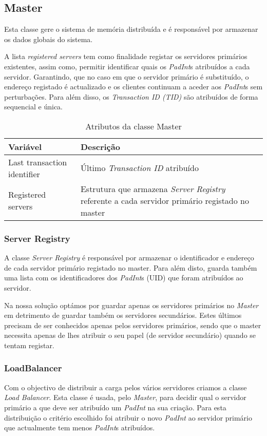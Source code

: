 \subsection{Master}

Esta classe gere o sistema de memória distribuída e é responsável por armazenar os dados globais do sistema.

A lista \textit{registered servers} tem como finalidade registar os servidores primários existentes, assim como, permitir identificar quais os \textit{PadInt}s atribuídos a cada servidor. Garantindo, que no caso em que o servidor primário é substituído, o endereço registado é actualizado e os clientes continuam a aceder aos \textit{PadInt}s sem perturbações. Para além disso, os \textit{Transaction ID (TID)} são atribuídos de forma sequencial e única.
\begin{table}[H]
\centering
\begin{tabular}{| p{2cm} | p{5cm} |}
\hline
\textbf{Variável} & \textbf{Descrição} \\
\hline
Last transaction
identifier & Último \textit{Transaction ID} atribuído \\
\hline
Registered
servers & Estrutura que armazena \textit{ Server Registry} referente a cada servidor primário registado no master \\
\hline
\end{tabular}
\caption{Atributos da classe Master}
\end{table}


\subsubsection{Server Registry}
A classe \textit{Server Registry} é responsável por armazenar o identificador e endereço de cada servidor primário registado no master. Para além disto, guarda também uma lista com os identificadores dos \textit{PadInt}s  (UID) que foram atribuídos ao servidor.

Na nossa solução optámos por guardar apenas os servidores primários no \textit{Master} em detrimento de guardar também os servidores secundários. Estes últimos precisam de ser conhecidos apenas pelos servidores primários, sendo que o master necessita apenas de lhes atribuir o seu papel (de servidor secundário) quando se tentam registar.

\subsubsection{LoadBalancer}
Com o objectivo de distribuir a carga pelos vários servidores criamos a classe \textit{Load Balancer}. Esta classe é usada, pelo \textit{Master}, para decidir qual o servidor primário a que deve ser atribuído um \textit{PadInt} na sua criação. Para esta distribuição o critério escolhido foi atribuir o novo \textit{PadInt} ao servidor primário que actualmente tem menos \textit{PadInt}s atribuídos.

